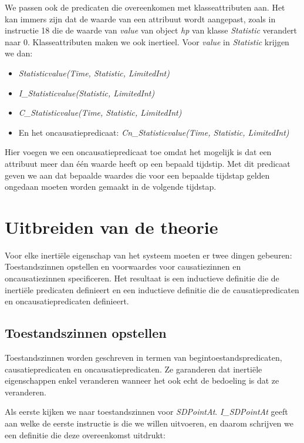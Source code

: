 We passen ook de predicaten die overeenkomen met klasseattributen aan. Het kan immers zijn dat de waarde van een attribuut wordt aangepast, zoals in instructie 18 die de waarde van \textit{value} van object \textit{hp} van klasse \textit{Statistic} verandert naar 0. Klasseattributen maken we ook inertieel. Voor \textit{value} in \textit{Statistic} krijgen we dan:

\begin{itemize}
	\item \textit{Statisticvalue(Time, Statistic, LimitedInt)}
	\item \textit{I\_Statisticvalue(Statistic, LimitedInt)}
	\item \textit{C\_Statisticvalue(Time, Statistic, LimitedInt)}
	\item En het oncausatiepredicaat: \textit{Cn\_Statisticvalue(Time, Statistic, LimitedInt)}
\end{itemize}

Hier voegen we een oncausatiepredicaat toe omdat het mogelijk is dat een attribuut meer dan \'e\'en waarde heeft op een bepaald tijdstip. Met dit predicaat geven we aan dat bepaalde waardes die voor een bepaalde tijdstap gelden ongedaan moeten worden gemaakt in de volgende tijdstap.

\section{Uitbreiden van de theorie}
Voor elke inerti\"ele eigenschap van het systeem moeten er twee dingen gebeuren: Toestandszinnen opstellen en voorwaardes voor causatiezinnen en oncausatiezinnen specificeren. Het resultaat is een inductieve definitie die de inerti\"ele predicaten definieert en een inductieve definitie die de causatiepredicaten en oncausatiepredicaten definieert.

\subsection{Toestandszinnen opstellen}
Toestandszinnen worden geschreven in termen van begintoestandspredicaten, causatiepredicaten en oncausatiepredicaten. Ze garanderen dat inerti\"ele eigenschappen enkel veranderen wanneer het ook echt de bedoeling is dat ze veranderen.

Als eerste kijken we naar toestandszinnen voor \textit{SDPointAt}. \textit{I\_SDPointAt} geeft aan welke de eerste instructie is die we willen uitvoeren, en daarom schrijven we een definitie die deze overeenkomst uitdrukt:


